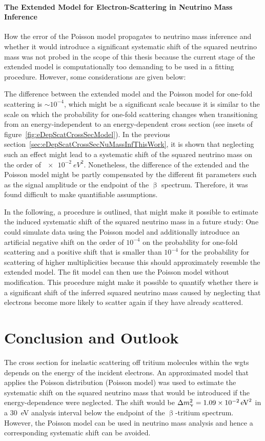 \paragraph{The Extended Model for Electron-Scattering in Neutrino Mass Inference}
How the error of the Poisson model propagates to neutrino mass inference and whether it would introduce a significant systematic shift of the squared neutrino mass was not probed in the scope of this thesis because the current stage of the extended model is computationally too demanding to be used in a fitting procedure. However, some considerations are given below:

The difference between the extended model and the Poisson model for one-fold scattering is $\sim10^{-4}$, which might be a significant scale because it is similar to the scale on which the probability for one-fold scattering changes when transitioning from an energy-independent to an energy-dependent cross section (see insets of figure~\ref{fig:eDepScatCrossSecModel}). In the previous section~\ref{sec:eDepScatCrossSecNuMassInfThisWork}, it is shown that neglecting such an effect might lead to a systematic shift of the squared neutrino mass on the order of $\SI{e-2}{eV^2}$. Nonetheless, the difference of the extended and the Poisson model might be partly compensated by the different fit parameters such as the signal amplitude or the endpoint of the $\upbeta$ spectrum. Therefore, it was found difficult to make quantifiable assumptions.

In the following, a procedure is outlined, that might make it possible to estimate the induced systematic shift of the squared neutrino mass in a future study: One could simulate data using the Poisson model and additionally introduce an artificial negative shift on the order of $10^{-4}$ on the probability for one-fold scattering and a positive shift that is smaller than $10^{-4}$ for the probability for scattering of higher multiplicities because this should approximately resemble the extended model. The fit model can then use the Poisson model without modification. This procedure might make it possible to quantify whether there is a significant shift of the inferred squared neutrino mass caused by neglecting that electrons become more likely to scatter again if they have already scattered.

\section{Conclusion and Outlook}
\label{sec:eDepScatCrossSecConclusion}
The cross section for inelastic scattering off tritium molecules within the \gls{wgts} depends on the energy of the incident electrons. An approximated model that applies the Poisson distribution (Poisson model) was used to estimate the systematic shift on the squared neutrino mass that would be introduced if the energy-dependence were neglected. The shift would be $\Delta m_\upnu^2 = \SI{1.09e-2}{eV^2}$ in a \SI{30}{eV} analysis interval below the endpoint of the $\upbeta$-tritium spectrum. However, the Poisson model can be used in neutrino mass analysis and hence a corresponding systematic shift can be avoided.


